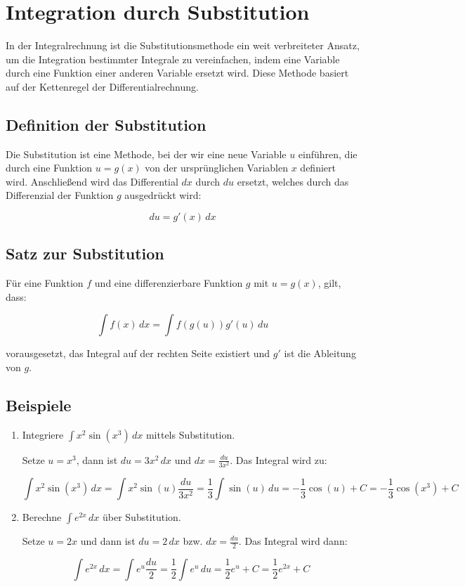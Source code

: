 \documentclass[a4paper,12pt]{article}
\begin{document}
\section*{Integration durch Substitution}
In der Integralrechnung ist die Substitutionsmethode ein weit verbreiteter Ansatz, um die Integration bestimmter Integrale zu vereinfachen, indem eine Variable durch eine Funktion einer anderen Variable ersetzt wird. Diese Methode basiert auf der Kettenregel der Differentialrechnung.

\subsection*{Definition der Substitution}
Die Substitution ist eine Methode, bei der wir eine neue Variable \( u \) einführen, die durch eine Funktion \( u = g(x) \) von der ursprünglichen Variablen \( x \) definiert wird. Anschließend wird das Differential \( dx \) durch \( du \) ersetzt, welches durch das Differenzial der Funktion \( g \) ausgedrückt wird:

\[
du = g'(x) \, dx
\]

\subsection*{Satz zur Substitution}
Für eine Funktion \( f \) und eine differenzierbare Funktion \( g \) mit \( u = g(x) \), gilt, dass:

\[
\int f(x) \, dx = \int f(g(u)) g'(u) \, du
\]

vorausgesetzt, das Integral auf der rechten Seite existiert und \( g' \) ist die Ableitung von \( g \).

\subsection*{Beispiele}
\begin{enumerate}
    \item Integriere \( \int x^2 \sin(x^3) \, dx \) mittels Substitution.
    
    Setze \( u = x^3 \), dann ist \( du = 3x^2 \, dx \) und \( dx = \frac{du}{3x^2} \). Das Integral wird zu:
    
    \[
    \int x^2 \sin(x^3) \, dx = \int x^2 \sin(u) \frac{du}{3x^2} = \frac{1}{3} \int \sin(u) \, du = -\frac{1}{3} \cos(u) + C = -\frac{1}{3} \cos(x^3) + C
    \]
    
    \item Berechne \( \int e^{2x} \, dx \) über Substitution.
    
    Setze \( u = 2x \) und dann ist \( du = 2 \, dx \) bzw. \( dx = \frac{du}{2} \). Das Integral wird dann:
    
    \[
    \int e^{2x} \, dx = \int e^u \frac{du}{2} = \frac{1}{2} \int e^u \, du = \frac{1}{2} e^u + C = \frac{1}{2} e^{2x} + C
    \]
\end{enumerate}
\end{document}
